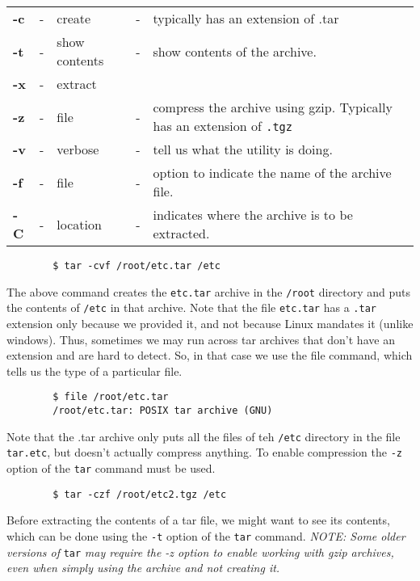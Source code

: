 \documentclass{report}
\begin{document}
	\begin{tabular}{lclcl}
		\textbf{-c} &- &create &- &typically has an extension of .tar \\
		\textbf{-t} &- &show contents &- &show contents of the archive. \\
		\textbf{-x} &- &extract & & \\
		\textbf{-z} &- &file &- &compress the archive using gzip. Typically has an extension of \verb|.tgz| \\
		\textbf{-v} &- &verbose &- &tell us what the utility is doing. \\
		\textbf{-f} &- &file &- &option to indicate the name of the archive file. \\
		\textbf{-C} &- &location &- &indicates where the archive is to be extracted. \\		
	\end{tabular}

	\begin{verbatim}
		$ tar -cvf /root/etc.tar /etc
	\end{verbatim}
	
	\noindent
	The above command creates the \verb|etc.tar| archive in the \verb|/root| directory and puts the contents of \verb|/etc| in that archive. Note that the file \verb|etc.tar| has a \verb|.tar| extension only because we provided it, and not because Linux mandates it (unlike windows). Thus, sometimes we may run across tar archives that don't have an extension and are hard to detect. So, in that case we use the file command, which tells us the type of a particular file.
	
	\begin{verbatim}
		$ file /root/etc.tar
		/root/etc.tar: POSIX tar archive (GNU)
	\end{verbatim}
	
	\noindent
	Note that the .tar archive only puts all the files of teh \verb|/etc| directory in the file \verb|tar.etc|, but doesn't actually compress anything. To enable compression the \verb|-z| option of the \verb|tar| command must be used. 
	
	\begin{verbatim}
		$ tar -czf /root/etc2.tgz /etc
	\end{verbatim}
	
	\noindent
	Before extracting the contents of a tar file, we might want to see its contents, which can be done using the \verb|-t| option of the \verb|tar| command. \textit{NOTE: Some older versions of} \verb|tar| \textit{may require the -z option to enable working with gzip archives, even when simply using the archive and not creating it.}
	
\end{document}

